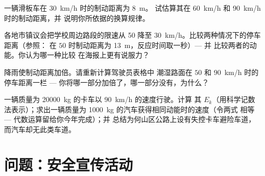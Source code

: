 \begin{exercise}[$\star\star$]\label{exo:g9:kinetic-energy-safety:9}
一辆滑板车在 \qty{30}{km/h} 时的制动距离为 \qty{8}{m}。
试估算其在 \qty{60}{km/h} 和 \qty{90}{km/h} 时的制动距离，并
说明你所依据的换算规律。
\end{exercise}

\begin{exercise}[$\star\star$]\label{exo:g9:kinetic-energy-safety:10}
各地市镇议会把学校周边路段的限速从 \qty{50}{} 降至
\qty{30}{km/h}。比较两种情况下的停车距离（参照：
在 $50$ 时制动距离为 \qty{13}{m}，反应时间取一秒）--- 并
比较两者的动能。你认为哪一种比较
在海报上更有说服力？
\end{exercise}

\begin{exercise}[$\star\star$]\label{exo:g9:kinetic-energy-safety:11}
降雨使制动距离加倍。请重新计算驾驶员表格中
潮湿路面在 $50$ 和 \qty{90}{km/h} 时的停车距离一栏 ---
你将哪一部分加倍了，哪一部分没有，为什么？
\end{exercise}

\begin{exercise}[$\star\star\star$]\label{exo:g9:kinetic-energy-safety:12}
一辆质量为 \qty{20000}{kg} 的卡车以 \qty{90}{km/h} 的速度行驶。计算
其 $E_k$（用科学记数法表示）；求出一辆质量为
\qty{1000}{kg} 的汽车获得相同动能时的速度（令两式
相等 --- 代数运算留给你今年完成）；并
总结为何山区公路上设有失控卡车避险车道，
而汽车却无此类车道。
\end{exercise}

\section{问题：安全宣传活动}


